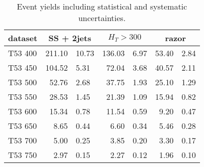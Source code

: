 \begin{table}
    \centering
    \begin{tabular}{l *3{r@{$\pm$}l}}
        \toprule
        dataset & \multicolumn{2}{c}{SS + 2jets}& \multicolumn{2}{c}{$H_T >
        300$}& \multicolumn{2}{c}{razor} \\
        \midrule
        T53 400& 211.10 & 10.73& 136.03 & 6.97& 53.40 & 2.84\\
        T53 450& 104.52 & 5.31& 72.04 & 3.68& 40.57 & 2.11\\
        T53 500& 52.76 & 2.68& 37.75 & 1.93& 25.10 & 1.29\\
        T53 550& 28.53 & 1.45& 21.39 & 1.09& 15.94 & 0.82\\
        T53 600& 15.34 & 0.78& 11.54 & 0.59& 9.20 & 0.47\\
        T53 650& 8.65 & 0.44& 6.60 & 0.34& 5.46 & 0.28\\
        T53 700& 5.00 & 0.25& 3.85 & 0.20& 3.30 & 0.17\\
        T53 750& 2.97 & 0.15& 2.27 & 0.12& 1.96 & 0.10\\
        \bottomrule
    \end{tabular}
    \caption{Event yields including statistical and systematic uncertainties.}
\end{table}

